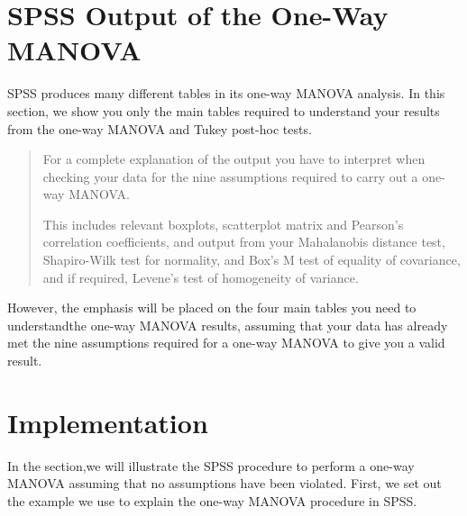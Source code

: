 \documentclass[a4paper,12pt]{article}
\begin{document}
%
%
%
%
%
%
%
%
%
\newpage
\section{SPSS Output of the One-Way MANOVA}
SPSS produces many different tables in its one-way MANOVA analysis. In this section, we show you only the main tables required to understand your results from the one-way MANOVA and Tukey post-hoc tests.

\begin{quote}
	For a complete explanation of the output you have to interpret when checking your data for the nine assumptions required to carry out a one-way MANOVA.
	
	This includes relevant boxplots, scatterplot matrix and Pearson's correlation coefficients, and output from your Mahalanobis distance test, Shapiro-Wilk test for normality, and Box's M test of equality of covariance, and if required, Levene's test of homogeneity of variance.
\end{quote}
However, the emphasis will be placed on the four main tables you need to understandthe one-way MANOVA results, assuming that your data has already met the nine assumptions required for a one-way MANOVA to give you a valid result.







\section{Implementation}
In the section,we will illustrate the SPSS procedure to perform a one-way MANOVA assuming that no assumptions have been violated. First, we set out the example we use to explain the one-way MANOVA procedure in SPSS.
\end{document}
